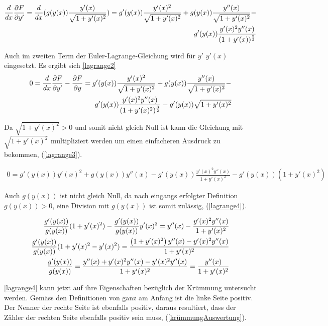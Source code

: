 \begin{align}
	\frac{d}{dx} \frac{\partial F}{\partial y'} = \frac{d}{dx} (g(y(x)) \frac{y'(x)}{\sqrt{1 + y'(x)^2}})
	 = g'(y(x)) \frac{y'(x)^2}{\sqrt{1 + y'(x)^2}} + g(y(x)) \frac{y''(x)}{\sqrt{1 + y'(x)^2}} - \notag \\
	 g'(y(x)) \frac{y'(x)^2 y''(x)}{(1 + y'(x))^\frac{3}{2}} 
	 \label{lagrange1}
\end{align}

Auch im zweiten Term der Euler-Lagrange-Gleichung wird für $y'$ $y'(x)$ eingesetzt. Es ergibt sich \eqref{lagrange2}
\begin{align}
	0 = \frac{d}{dx} \frac{\partial F}{\partial y'} - \frac{\partial F}{\partial y} = 
	g'(y(x)) \frac{y'(x)^2}{\sqrt{1 + y'(x)^2}} + g(y(x)) \frac{y''(x)}{\sqrt{1 + y'(x)^2}} - \notag \\
	g'(y(x)) \frac{y'(x)^2 y''(x)}{(1 + y'(x)^2)^\frac{3}{2}}  - g'(y(x)) \sqrt{1 + y'(x)^2}
	\label{lagrange2}
\end{align}

Da $\sqrt{1 + y'(x)^2} > 0$ und somit nicht gleich Null ist kann die Gleichung mit $\sqrt{1 + y'(x)^2}$  multipliziert werden um einen einfacheren Ausdruck zu bekommen, (\eqref{lagrange3}).

\begin{align}
	0 = g'(y(x)) y'(x)^2 + g(y(x)) y''(x) - g'(y(x)) \frac{y'(x)^2 y''(x)}{1 + y'(x)^2} - g'(y(x)) (1 + y'(x)^2)
	\label{lagrange3}
\end{align}

Auch $g(y(x))$ ist nicht gleich Null, da nach eingangs erfolgter Definition $g(y(x)) > 0$, eine Division mit $g(y(x))$ ist somit zulässig, (\eqref{lagrange4}).

\begin{align}
	\frac{g'(y(x))}{g(y(x))} (1 + y'(x)^2) - \frac{g'(y(x))}{g(y(x))} y'(x)^2 =  y''(x) - \frac{y'(x)^2 y''(x)}{1 + y'(x)^2} \notag \\
	\frac{g'(y(x))}{g(y(x))} (1 + y'(x)^2 - y'(x)^2) = \frac{\left(1 + y'(x)^2 \right)y''(x) - y'(x)^2 y''(x)}{1 + y'(x)^2} \notag \\
	\frac{g'(y(x))}{g(y(x))} = \frac{y''(x) + y'(x)^2 y''(x) - y'(x)^2 y''(x)}{1 + y'(x)^2} = \frac{y''(x)}{1 + y'(x)^2}
	\label{lagrange4}
\end{align}


\eqref{lagrange4} kann jetzt auf ihre Eigenschaften bezüglich der Krümmung untersucht werden. Gemäss den Definitionen von ganz am Anfang ist die linke Seite positiv. 
Der Nenner der rechte Seite ist ebenfalls positiv, daraus resultiert, dass der Zähler der rechten Seite ebenfalls positiv sein muss, (\eqref{krümmungAuswertung}).


